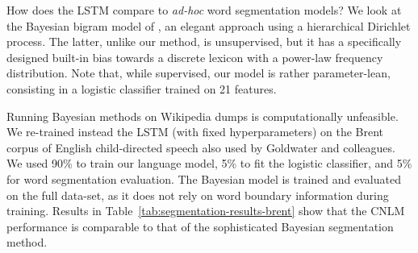 How does the LSTM compare to \emph{ad-hoc} word segmentation models?
We look at the Bayesian bigram model of
, an elegant approach using a
hierarchical Dirichlet process.  The latter, unlike our method, is
unsupervised, but it has a specifically designed built-in bias towards
a discrete lexicon with a power-law frequency distribution. Note that,
while supervised, our model is rather parameter-lean, consisting in a
logistic classifier trained on 21 features.

Running Bayesian methods on Wikipedia dumps is computationally
unfeasible. We re-trained instead the LSTM (with fixed
hyperparameters) on the Brent corpus of English child-directed speech
\cite{brent-efficient-1999} also used by Goldwater and colleagues.  We
used 90\% to train our language model, 5\% to fit the logistic
classifier, and 5\% for word segmentation evaluation.  The Bayesian
model is trained and evaluated on the full data-set, as it does not
rely on word boundary information during training. Results in
Table~\ref{tab:segmentation-results-brent} show that the CNLM
performance is comparable to that of the sophisticated Bayesian
segmentation method.



